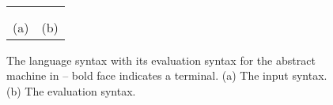 



\newsavebox{\boxLangSyntax}

\begin{lrbox}{\boxLangSyntax}
\begin{minipage}[c]{0.3\linewidth}
\cfgstart
{}
\cfgrule{\thread}{\lp\cfgnt{\cmd}~$\ldots$~$\bot$\rp}
\cfgrule{\cmd}{\lp\cfgt{\sendi}~\cfgt{\aid}~\cfgt{\num}~\cfgt{\num}\rp}
   \cfgorline{\lp\cfgt{\recvi}~\cfgt{\aid}~\cfgt{\num}~\cfgt{\num}~\cfgt{\aid}\rp}
   \cfgorline{\lp\cfgt{\wait}~\cfgt{\aid}\rp}
   \cfgorline{\lp\cfgt{\barrier}~\cfgt{\aid}\rp}
\
    \cfgorline{\cfgt{$\ast$}}
\cfgrule{\rcvp}{\lp\aid~$\ldots$\rp}
\cfgend
\end{minipage}
\end{lrbox}


\newsavebox{\boxEvalSyntax}
\begin{lrbox}{\boxEvalSyntax}
\begin{minipage}[c]{0.3\linewidth}
\cfgstart
{}
\cfgrule{\epsnd}{\cfgt{\mt}\
   \cfgor\lp\cfgnt{\epsnd}~\lb\lp\cfgt{\num},\cfgt{\num}\rp~$\rightarrow$~\cfgt{\num}\rb\rp}
\cfgrule{\eprcv}{\cfgt{\mt}\
   \cfgor\lp\cfgnt{\eprcv}~\lb\lp\cfgt{\num},\cfgt{\num}\rp~$\rightarrow$~\cfgt{\num}\rb\rp}
\cfgrule{\epbarrier}{\cfgt{\mt}\
   \cfgor\lp\cfgnt{\epbarrier}~\lb\cfgnt{\aid}~$\rightarrow$~\cfgt{\num}\rb\rp}
\cfgend
\end{minipage}
\end{lrbox}

\begin{figure}
\begin{center}
\setlength{\tabcolsep}{15pt}
\begin{tabular}{cc}
\scalebox{0.75}{\usebox{\boxLangSyntax}}
&
\scalebox{0.75}{\usebox{\boxEvalSyntax}}
\\ \\
(a) & (b)
\end{tabular}
\end{center}
\caption{The language syntax with its evaluation syntax for the abstract machine in  -- bold face indicates a terminal. (a) The input syntax. (b) The evaluation syntax.}
\label{fig:expr:stx}
\end{figure}

\examplefigthree




